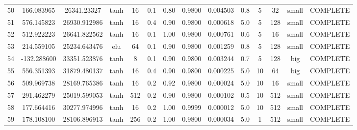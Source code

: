 \begin{longtable}{cccccccccccccc}
                       50 &                 166.083965 &                        26341.23327 &            tanh &          16 &         0.1 &        0.80 & 0.9800 &       0.004503 &             0.8 &         5 &       32 &     small & COMPLETE \\
                       51 &                 576.145823 &                       26930.912986 &            tanh &          16 &         0.4 &        0.90 & 0.9800 &       0.000618 &             5.0 &         5 &      128 &     small & COMPLETE \\
                       52 &                 512.922223 &                       26641.822562 &            tanh &          16 &         0.1 &        1.00 & 0.9800 &       0.000761 &             0.6 &         5 &       16 &     small & COMPLETE \\
                       53 &                 214.559105 &                       25234.643476 &             elu &          64 &         0.1 &        0.90 & 0.9800 &       0.001259 &             0.8 &         5 &      128 &     small & COMPLETE \\
                       54 &                -132.288600 &                       33351.523876 &            tanh &           8 &         0.1 &        0.90 & 0.9800 &       0.003244 &             0.7 &         5 &      128 &       big & COMPLETE \\
                       55 &                 556.351393 &                       31879.480137 &            tanh &          16 &         0.4 &        0.90 & 0.9800 &       0.000225 &             5.0 &        10 &       64 &       big & COMPLETE \\
                       56 &                 509.969738 &                       28169.765386 &            tanh &          16 &         0.2 &        0.92 & 0.9800 &       0.000024 &             5.0 &        10 &       16 &     small & COMPLETE \\
                       57 &                 291.462279 &                       25019.599053 &            tanh &         512 &         0.2 &        0.90 & 0.9800 &       0.000102 &             0.5 &        10 &      512 &     small & COMPLETE \\
                       58 &                 177.664416 &                       30277.974996 &            tanh &          16 &         0.2 &        1.00 & 0.9999 &       0.000012 &             5.0 &        10 &      512 &     small & COMPLETE \\
                       59 &                 178.108100 &                       28106.896913 &            tanh &         256 &         0.2 &        1.00 & 0.9800 &       0.000034 &             5.0 &         1 &      512 &     small & COMPLETE \\

\end{longtable}
